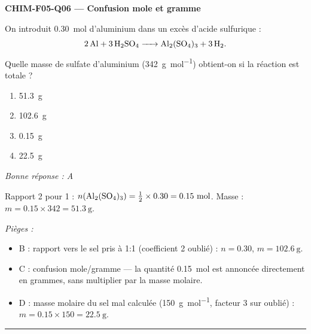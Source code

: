 \documentclass[11pt,a4paper]{article}
\begin{document}
\noindent\textbf{CHIM-F05-Q06 --- Confusion mole et gramme}\par
On introduit \qty{0.30}{\mole} d'aluminium dans un excès d'acide sulfurique :
\[\ce{2 Al + 3 H2SO4 -> Al2(SO4)3 + 3 H2}.\]
Quelle masse de sulfate d'aluminium (\qty{342}{\gram\per\mole}) obtient-on si la réaction est totale ?
\begin{enumerate}[label=\Alph*)]
\item \qty{51.3}{\gram}
\item \qty{102.6}{\gram}
\item \qty{0.15}{\gram}
\item \qty{22.5}{\gram}
\end{enumerate}
\textit{Bonne réponse : A}\par
Rapport \num{2}  pour \num{1}  : $n(\ce{Al2(SO4)3})=\tfrac{1}{2}\times\num{0.30}=\num{0.15}~\si{\mole}$. Masse : $m=\num{0.15}\times\num{342}=\qty{51.3}{\gram}$.\par
\textit{Pièges :}
\begin{itemize}
\item B : rapport  vers le sel pris à \num{1}:\num{1} (coefficient \num{2} oublié) : $n=\num{0.30}$, $m=\qty{102.6}{\gram}$.
\item C : confusion mole/gramme — la quantité \num{0.15}~\si{\mole} est annoncée directement en grammes, sans multiplier par la masse molaire.
\item D : masse molaire du sel mal calculée (\qty{150}{\gram\per\mole}, facteur \num{3} sur  oublié) : $m=\num{0.15}\times\num{150}=\qty{22.5}{\gram}$.
\end{itemize}
\vspace{6pt}\hrule\vspace{8pt}
\end{document}
